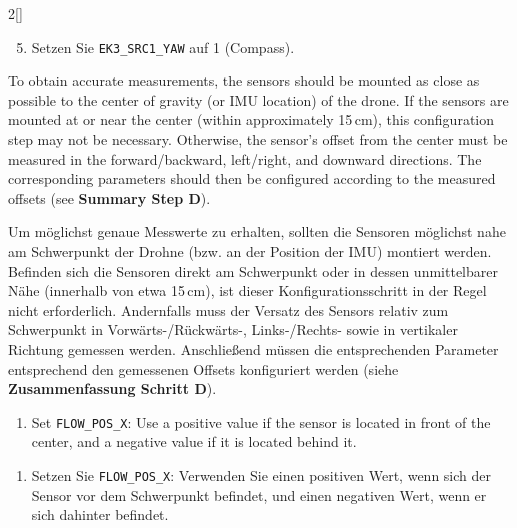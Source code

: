 \begin{paracol}{2}[]
\colger

\begin{enumerate}
\setcounter{enumi}{4}
\item Setzen Sie \texttt{EK3\_SRC1\_YAW} auf 1 (Compass).
\end{enumerate}

\colende
\renewcommand{\deutschertitel}{Konfigurationsschritt: D (physische Position)}
\renewcommand{\englischertitel}{Configuration Step: D (Physical Position)}
\makrounterunterabschnitt

To obtain accurate measurements, the sensors should be mounted as close as possible to the center of gravity (or IMU location) of the drone. If the sensors are mounted at or near the center (within approximately 15\,cm), this configuration step may not be necessary. Otherwise, the sensor’s offset from the center must be measured in the forward/backward, left/right, and downward directions. The corresponding parameters should then be configured according to the measured offsets (see \textbf{Summary Step D}).

\colger

Um möglichst genaue Messwerte zu erhalten, sollten die Sensoren möglichst nahe am Schwerpunkt der Drohne (bzw. an der Position der IMU) montiert werden. Befinden sich die Sensoren direkt am Schwerpunkt oder in dessen unmittelbarer Nähe (innerhalb von etwa 15\,cm), ist dieser Konfigurationsschritt in der Regel nicht erforderlich. Andernfalls muss der Versatz des Sensors relativ zum Schwerpunkt in Vorwärts-/Rückwärts-, Links-/Rechts- sowie in vertikaler Richtung gemessen werden. Anschließend müssen die entsprechenden Parameter entsprechend den gemessenen Offsets konfiguriert werden (siehe \textbf{Zusammenfassung Schritt D}).

\coleng

\begin{enumerate} 
\item Set \texttt{FLOW\_POS\_X}: Use a positive value if the sensor is located in front of the center, and a negative value if it is located behind it.
\end{enumerate}

\colger

\begin{enumerate}
\item Setzen Sie \texttt{FLOW\_POS\_X}: Verwenden Sie einen positiven Wert, wenn sich der Sensor vor dem Schwerpunkt befindet, und einen negativen Wert, wenn er sich dahinter befindet.
\end{enumerate}


\end{paracol}
